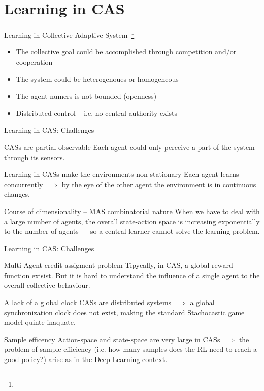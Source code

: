 \documentclass[presentation]{beamer}\mode<presentation>{\usetheme{AMSBolognaFC}}
\begin{document}
\section{Learning in CAS}
\begin{frame}[c]{Learning in Collective Adaptive System~\footnote[frame]{}}
\begin{exampleblock}{}
	\begin{itemize}
		\item The collective goal could be accomplished through competition and/or cooperation 
		\item The system could be heterogenoues or homogeneous
		\item The agent numers is not bounded (openness)
		\item Distributed control -- i.e. no central authority exists
	\end{itemize}
\end{exampleblock}
\end{frame}
\begin{frame}[c]{Learning in CAS: Challenges}
	\begin{exampleblock}{CASs are partial observable}
		Each agent could only perceive a part of the system through its sensors.
	\end{exampleblock}
	\begin{alertblock}{Learning in CASs make the environments non-stationary}
		Each agent learns concurrently $\implies$ by the eye of the other agent the environment is in continuous changes.
	\end{alertblock}
	\begin{alertblock}{Course of dimensionality -- MAS combinatorial nature}
		When we have to deal with a large number of agents, the overall state-action space is increasing exponentially to the number of agents --- so a central learner cannot solve the learning problem.
	\end{alertblock}
\end{frame}
\begin{frame}[c]{Learning in CAS: Challenges}
	\begin{exampleblock}{Multi-Agent credit assigment problem}
		Tipycally, in CAS, a global reward function exisist. But it is hard to understand the influence of a single agent to
		the overall collective behaviour.
	\end{exampleblock}
	\begin{exampleblock}{A lack of a global clock}
		CASs are distributed systems $\implies$ a global synchronization clock does not exist, making the standard
		Stachocastic game model quinte inaquate.
	\end{exampleblock}
	\begin{exampleblock}{Sample efficency}
		Action-space and state-space are very large in CASs $\implies$ the problem of sample efficiency (i.e. how many samples does the RL need to reach a good policy?)
		arise as in the Deep Learning context. 
	\end{exampleblock}
\end{frame}
\end{document}
